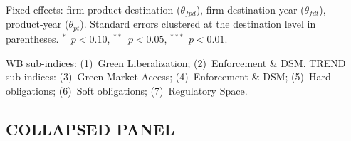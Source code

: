 \documentclass{article}
\begin{document}
\begin{table}[htbp]
\begin{threeparttable}
\begin{tablenotes}[flushleft]
  Fixed effects: firm-product-destination ($\theta_{fpd}$), firm-destination-year ($\theta_{fdt}$), product-year ($\theta_{pt}$).
  Standard errors clustered at the destination level in parentheses.
  $^{*}$~$p<0.10$, $^{**}$~$p<0.05$, $^{***}$~$p<0.01$.
\item WB sub-indices: (1)~Green Liberalization; (2)~Enforcement \& DSM.
  TREND sub-indices: (3)~Green Market Access; (4)~Enforcement \& DSM; (5)~Hard obligations;
  (6)~Soft obligations; (7)~Regulatory Space.
\end{tablenotes}
\end{threeparttable}
\end{table}

\newpage
\subsection{COLLAPSED PANEL}
\end{document}
